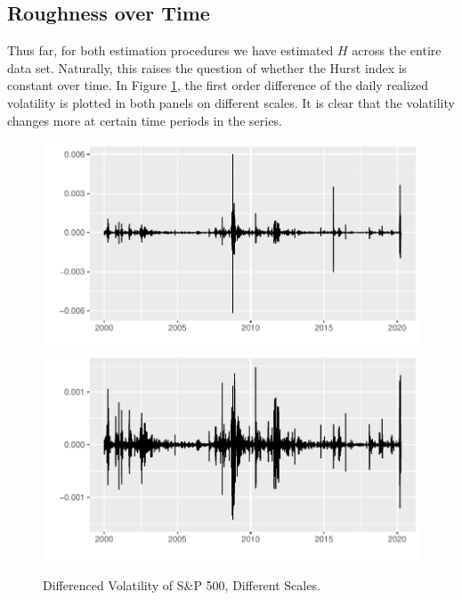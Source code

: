 \subsection{Roughness over Time}
Thus far, for both estimation procedures we have estimated $H$ across the entire data set. Naturally, this raises the question of whether the Hurst index is constant over time. In Figure \ref{fig:diff_plot}, the first order difference of the daily realized volatility is plotted in both panels on different scales. It is clear that the volatility changes more at certain time periods in the series.
\begin{figure}[H]
    \centering
    \includegraphics[scale=0.5]{fig/img/RealizedLib/diff_plot.pdf}
    \includegraphics[scale=0.5]{fig/img/RealizedLib/diff_plot2.pdf}
    \caption{Differenced Volatility of S\&P 500, Different Scales.}
    \label{fig:diff_plot}
\end{figure}

